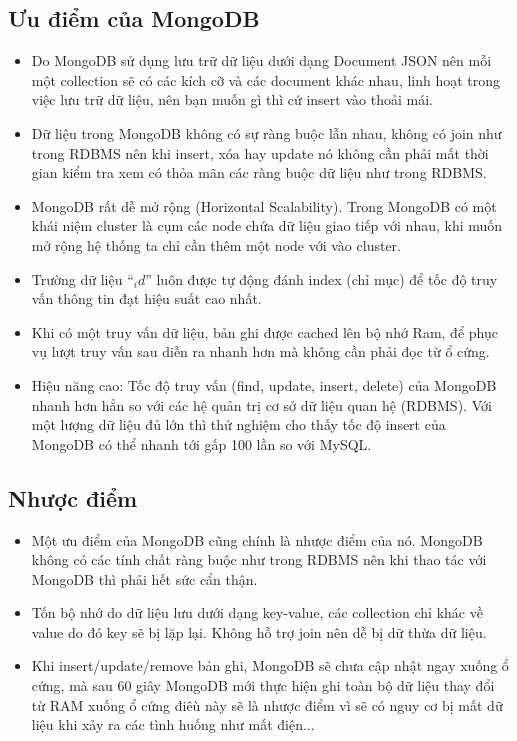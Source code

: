 \subsection{Ưu điểm của MongoDB}
\begin{itemize}
	\item Do MongoDB sử dụng lưu trữ dữ liệu dưới dạng Document JSON nên mỗi một collection sẽ có các kích cỡ và các document khác nhau, linh hoạt trong việc lưu trữ dữ liệu, nên bạn muốn gì thì cứ insert vào thoải mái.
	\item Dữ liệu trong MongoDB không có sự ràng buộc lẫn nhau, không có join như trong RDBMS nên khi insert, xóa hay update nó không cần phải mất thời gian kiểm tra xem có thỏa mãn các ràng buộc dữ liệu như trong RDBMS.
	\item MongoDB rất dễ mở rộng (Horizontal Scalability). Trong MongoDB có một khái niệm cluster là cụm các node chứa dữ liệu giao tiếp với nhau, khi muốn mở rộng hệ thống ta chỉ cần thêm một node với vào cluster.
	\item Trường dữ liệu $“_id”$ luôn được tự động đánh index (chỉ mục) để tốc độ truy vấn thông tin đạt hiệu suất cao nhất.
	\item Khi có một truy vấn dữ liệu, bản ghi được cached lên bộ nhớ Ram, để phục vụ lượt truy vấn sau diễn ra nhanh hơn mà không cần phải đọc từ ổ cứng.
	\item Hiệu năng cao: Tốc độ truy vấn (find, update, insert, delete) của MongoDB nhanh hơn hẳn so với các hệ quản trị cơ sở dữ liệu quan hệ (RDBMS). Với một lượng dữ liệu đủ lớn thì thử nghiệm cho thấy tốc độ insert của MongoDB có thể nhanh tới gấp 100 lần so với MySQL. 
\end{itemize}
\label{ref{fig2_10}}

\subsection{Nhược điểm}
\begin{itemize}
	\item Một ưu điểm của MongoDB cũng chính là nhược điểm của nó. MongoDB không có các tính chất ràng buộc như trong RDBMS nên khi thao tác với MongoDB thì phải hết sức cẩn thận.
	\item Tốn bộ nhớ do dữ liệu lưu dưới dạng key-value, các collection chỉ khác về value do đó key sẽ bị lặp lại. Không hỗ trợ join nên dễ bị dữ thừa dữ liệu.
	\item Khi insert/update/remove bản ghi, MongoDB sẽ chưa cập nhật ngay xuống ổ cứng, mà sau 60 giây MongoDB mới thực hiện ghi toàn bộ dữ liệu thay đổi từ RAM xuống ổ cứng điêù này sẽ là nhược điểm vì sẽ có nguy cơ bị mất dữ liệu khi xảy ra các tình huống như mất điện...
\end{itemize}




